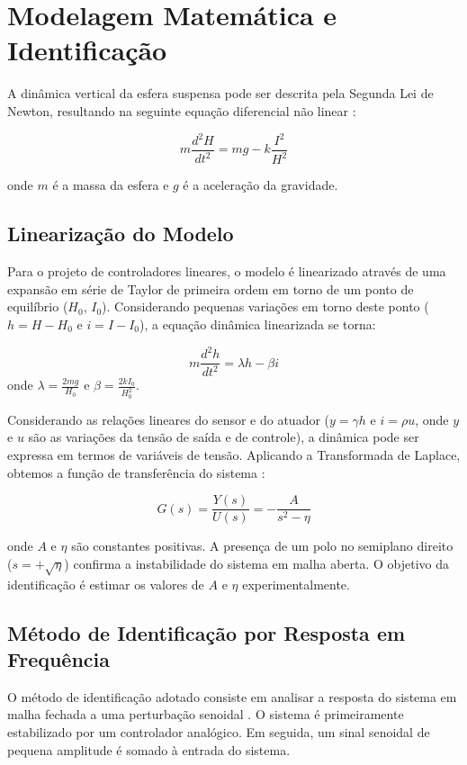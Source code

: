 \section{Modelagem Matemática e Identificação}

A dinâmica vertical da esfera suspensa pode ser descrita pela Segunda Lei de Newton, resultando na seguinte equação diferencial não linear \cite{kawakami2003}:

\begin{equation}
    m\frac{d^{2}H}{dt^{2}} = mg - k\frac{I^{2}}{H^{2}}
\end{equation}

onde $m$ é a massa da esfera e $g$ é a aceleração da gravidade.

\subsection{Linearização do Modelo}
Para o projeto de controladores lineares, o modelo é linearizado através de uma expansão em série de Taylor de primeira ordem em torno de um ponto de equilíbrio ($H_0$, $I_0$). Considerando pequenas variações em torno deste ponto ($h = H - H_0$ e $i = I - I_0$), a equação dinâmica linearizada se torna:

\begin{equation}
    m\frac{d^{2}h}{dt^{2}} = \lambda h - \beta i
\end{equation}
onde $\lambda = \frac{2mg}{H_0}$ e $\beta = \frac{2kI_0}{H_0^2}$.

Considerando as relações lineares do sensor e do atuador ($y = \gamma h$ e $i = \rho u$, onde $y$ e $u$ são as variações da tensão de saída e de controle), a dinâmica pode ser expressa em termos de variáveis de tensão. Aplicando a Transformada de Laplace, obtemos a função de transferência do sistema \cite{kawakami2003}:

\begin{equation}
    G(s) = \frac{Y(s)}{U(s)} = -\frac{A}{s^{2} - \eta}
    \label{eq:ft_planta}
\end{equation}

onde $A$ e $\eta$ são constantes positivas. A presença de um polo no semiplano direito ($s = +\sqrt{\eta}$) confirma a instabilidade do sistema em malha aberta. O objetivo da identificação é estimar os valores de $A$ e $\eta$ experimentalmente.

\subsection{Método de Identificação por Resposta em Frequência}
O método de identificação adotado consiste em analisar a resposta do sistema em malha fechada a uma perturbação senoidal \cite{kawakami2003}. O sistema é primeiramente estabilizado por um controlador analógico. Em seguida, um sinal senoidal de pequena amplitude é somado à entrada do sistema.

